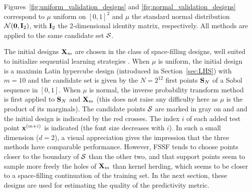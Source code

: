 Figures~\ref{fig:uniform_validation_designs} and \ref{fig:normal_validation_designs} correspond to $\mu$ uniform on $[0,1]^2$ and $\mu$ the standard normal distribution $\SN(\0b,\Ib_2)$, with $\mathbf{I}_2$ the 2-dimensional identity matrix, respectively. 
All methods are applied to the same candidate set $\mathcal{S}$. 

The initial designs ${\bf X}_m$ are chosen in the class of space-filling designs, well suited to initialize sequential learning strategies \citep{sanwil03}. 
When $\mu$ is uniform, the initial design is a maximin Latin hypercube design (introduced in Section~\ref{sec:LHS}) with $m=10$ and the candidate set is given by the $N=2^{12}$ first points $\mathbf{S}_N$ of a Sobol sequence in $[0,1]$. 
When $\mu$ is normal, the inverse probability transform method is first applied to $\mathbf{S}_N$ and ${\bf X}_m$ (this does not raise any difficulty here as $\mu$ is the product of its marginals). 
The candidate points $\mathcal{S}$ are marked in gray on  and  and the initial design is indicated by the red crosses. 
The index $i$ of each added test point ${\bf x}^{(m+i)}$ is indicated (the font size decreases with $i$). 
In such a small dimension ($d=2$), a visual appreciation gives the impression that the three methods have comparable performance. 
However, FSSF tends to choose points closer to the boundary of $\mathcal{S}$ than the other two, and that support points seem to sample more freely the holes of ${\bf X}_m$ than kernel herding, which seems to be closer to a space-filling continuation of the training set. 
In the next section, these designs are used for estimating the quality of the predictivity metric.


